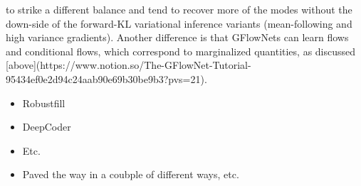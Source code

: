 to strike a different balance and tend to recover more of the modes without the down-side of the forward-KL variational inference variants (mean-following and high variance gradients). Another difference is that GFlowNets can learn flows and conditional flows, which correspond to marginalized quantities, as discussed [above](https://www.notion.so/The-GFlowNet-Tutorial-95434ef0e2d94c24aab90e69b30be9b3?pvs=21).




\begin{itemize}
    \item Robustfill
    \item DeepCoder
    \item Etc.
    \item Paved the way in a coubple of different ways, etc.
\end{itemize}















    
    
    
    



